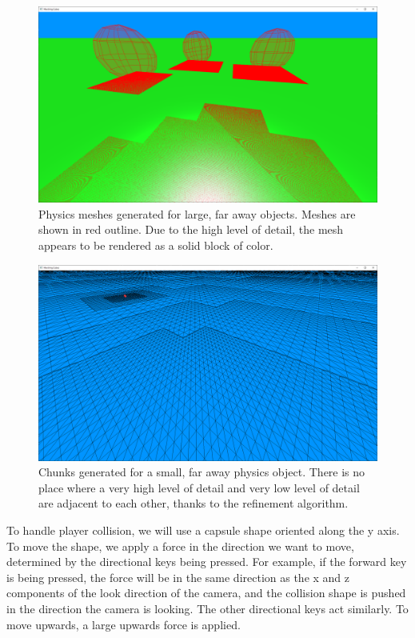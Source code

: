 \documentclass[11pt]{article}
\begin{document}
\begin{figure}[H]
  \includegraphics[width=\textwidth]{meshes2.png}
  \caption{Physics meshes generated for large, far away objects. Meshes are shown in red outline. Due to the high level of detail, the mesh appears to be rendered as a solid block of color.}
  \label{fig:meshes2}
\end{figure}

\begin{figure}[H]
  \includegraphics[width=\textwidth]{meshes3.png}
  \caption{Chunks generated for a small, far away physics object. There is no place where a very high level of detail and very low level of detail are adjacent to each other, thanks to the refinement algorithm.}
  \label{fig:meshes3}
\end{figure}

To handle player collision, we will use a capsule shape oriented along the y axis. To move the shape, we apply a force in the direction we want to move, determined by the directional keys being pressed. For example, if the forward key is being pressed, the force will be in the same direction as the x and z components of the look direction of the camera, and the collision shape is pushed in the direction the camera is looking. The other directional keys act similarly. To move upwards, a large upwards force is applied. 
\end{document}
